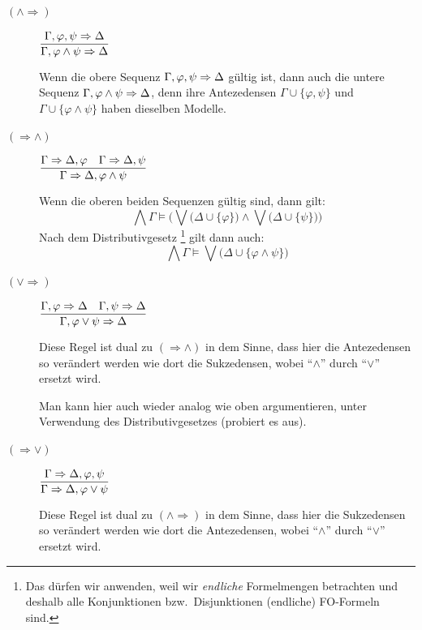 \documentclass[fontsize=11pt, twoside=false, numbers=autoenddot]{scrbook}
\begin{document}
\begin{description}
  \item[{\boldmath $(\land \Rightarrow)$}]
    $
      \displaystyle
      \frac{\Gamma,\varphi,\psi \Rightarrow \Delta}{\Gamma, \varphi \wedge \psi \Rightarrow \Delta}
    $
    ~\par\medskip
    Wenn die obere Sequenz $\Gamma,\varphi,\psi \Rightarrow \Delta$ gültig ist,
    dann auch die untere Sequenz $\Gamma, \varphi \wedge \psi \Rightarrow \Delta$,
    denn ihre Antezedensen $\Gamma \cup \{\varphi,\psi\}$ und
    $\Gamma \cup \{\varphi \land \psi\}$
    haben dieselben Modelle.
    \par\bigskip
  \item[{\boldmath $(\Rightarrow \land)$}]
    $
      \displaystyle
      \frac{\Gamma \Rightarrow \Delta,\varphi \quad \Gamma \Rightarrow \Delta,\psi}{\Gamma \Rightarrow \Delta, \varphi \wedge \psi}
    $
    ~\par\medskip
    Wenn die oberen beiden Sequenzen gültig sind, dann gilt:
    \[
      \bigwedge \Gamma \models
      \Big(
        \bigvee \big(\Delta \cup \{\varphi\}\big)
        \land
        \bigvee \big(\Delta \cup \{\psi\}\big)
      \Big)
    \]
    Nach dem Distributivgesetz%
    \footnote{%
      Das dürfen wir anwenden, weil wir \emph{endliche} Formelmengen betrachten
      und deshalb alle Konjunktionen bzw.\ Disjunktionen (endliche) FO-Formeln sind.%
    }
    gilt dann auch:
    \[
      \bigwedge \Gamma \models
      \bigvee \big(\Delta \cup \{\varphi \land \psi\}\big)
    \]
  \item[{\boldmath $(\lor \Rightarrow)$}]
    $
      \displaystyle
      \frac{\Gamma,\varphi \Rightarrow \Delta \quad \Gamma,\psi \Rightarrow \Delta}{\Gamma, \varphi \vee \psi \Rightarrow \Delta}
    $
    ~\par\medskip
    Diese Regel ist dual zu $(\Rightarrow \land)$
    in dem Sinne, dass hier die Antezedensen so verändert werden
    wie dort die Sukzedensen, wobei ``$\land$'' durch ``$\lor$'' ersetzt wird.

    Man kann hier auch wieder analog wie oben argumentieren, unter Verwendung des Distributivgesetzes (probiert es aus).
    \par\bigskip
  \item[{\boldmath $(\Rightarrow \lor)$}]
    $
      \displaystyle
      \frac{\Gamma \Rightarrow \Delta,\varphi,\psi}{\Gamma \Rightarrow \Delta, \varphi \vee \psi}
    $
    ~\par\medskip
    Diese Regel ist dual zu $(\land \Rightarrow)$
    in dem Sinne, dass hier die Sukzedensen so verändert werden
    wie dort die Antezedensen, wobei ``$\land$'' durch ``$\lor$'' ersetzt wird.


\end{description}
\end{document}
